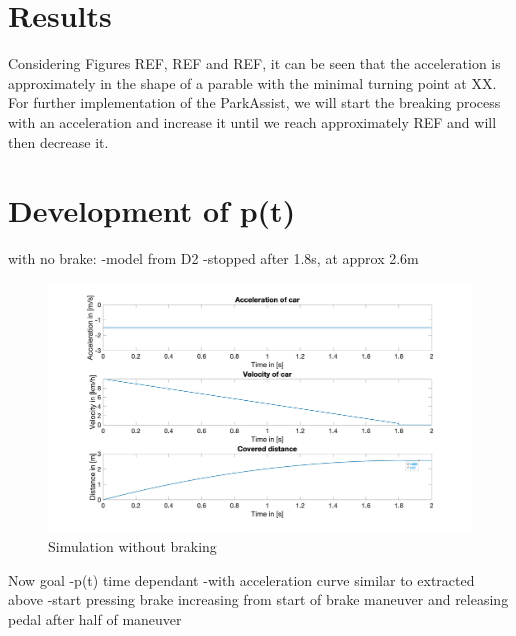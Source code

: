 \section{Results}
Considering Figures REF, REF and REF, it can be seen that the acceleration is approximately in the shape of a parable with the minimal turning point at XX. For further implementation of the ParkAssist, we will start the breaking process with an acceleration and increase it until we reach approximately REF and will then decrease it.

%
%
%

\section{Development of p(t)}
with no brake:
-model from D2
-stopped after 1.8s, at approx 2.6m
\begin{figure}[H]
\centering
\includegraphics[width=1\textwidth]{images/D3_no_brake.jpg}
\caption{Simulation without braking}
\label{fig:D3_IndividualBraking2}
\end{figure}

Now goal
-p(t) time dependant
-with acceleration curve similar to extracted above
-start pressing brake increasing from start of brake maneuver and releasing pedal after half of maneuver

